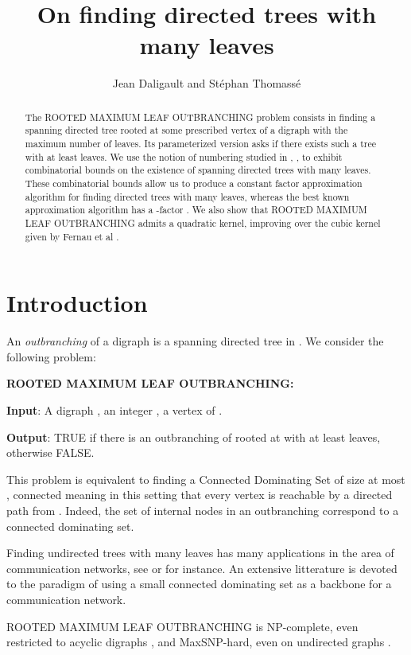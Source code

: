 \documentclass{article}
\title{On finding directed trees with many leaves}
\author{Jean Daligault and St\'ephan Thomass\'e}
\def\RMO{R{\footnotesize{OOTED}} M{\footnotesize{AXIMUM}} L{\footnotesize{EAF}} O{\footnotesize{UTBRANCHING}} }
\def\RMOC{R{\footnotesize{OOTED}} M{\footnotesize{AXIMUM}} L{\footnotesize{EAF}} O{\footnotesize{UTBRANCHING}}: }
\begin{document}
\maketitle

\begin{abstract}
The \RMO problem consists in finding a spanning directed tree rooted at some prescribed vertex of a 
digraph with the maximum number of leaves. Its parameterized version asks if there 
exists such a tree with at least  leaves. We use the notion of  numbering studied in \cite{stnum}, \cite{stnumdir}, \cite{LLWemb} to exhibit combinatorial bounds on the existence of spanning directed trees with many leaves. These combinatorial bounds allow us to produce a constant factor approximation algorithm for finding directed trees with many leaves, whereas the best known approximation algorithm has a -factor \cite{DrescherMaxLeaf}. We also show that \RMO admits a quadratic kernel, improving over the cubic kernel given by Fernau et al \cite{FernauMaxLeaf}.
\end{abstract}


\section{Introduction}
An \emph{outbranching} of a digraph  is a spanning directed tree in . 
We consider the following problem:

\vspace{12pt}
{\bf \RMOC}


\vspace{12pt}
\textbf{Input}: A digraph , an integer , a vertex  of .


\textbf{Output}: TRUE if there is an outbranching of  rooted at  with at least  leaves, otherwise FALSE.
\vspace{12pt}

This problem is equivalent to finding a Connected Dominating Set of size at most , connected meaning in this setting that every vertex is reachable by a directed path from . Indeed, the set of internal nodes in an outbranching correspond to a connected dominating set.

Finding undirected trees with many leaves has many applications in the area of communication networks, see \cite{MaxLeafApplication2} or \cite{MaxLeafApplication} for instance. An extensive litterature is devoted to the paradigm of using a small connected dominating set as a backbone for a communication network.

\RMO is NP-complete, even restricted to acyclic digraphs \cite{AlonMaxLeaf2}, and MaxSNP-hard, even on undirected graphs \cite{ApxHardMaxLeaf}.
\end{document}
